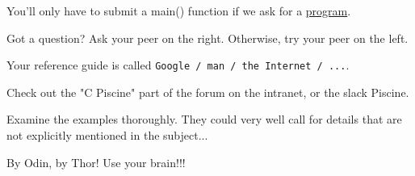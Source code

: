 \item You’ll only have to submit a main() function if we ask for a \underline{program}.
\item Got a question? Ask your peer on the right. Otherwise, try your peer
	on the left.
\item Your reference guide is called \texttt{Google / man / the Internet / ...}.
\item Check out the "C Piscine" part of the forum on the intranet, or the slack Piscine.
\item Examine the examples thoroughly. They could very well call for details that are not explicitly mentioned in the subject...
\item By Odin, by Thor! Use your brain!!!